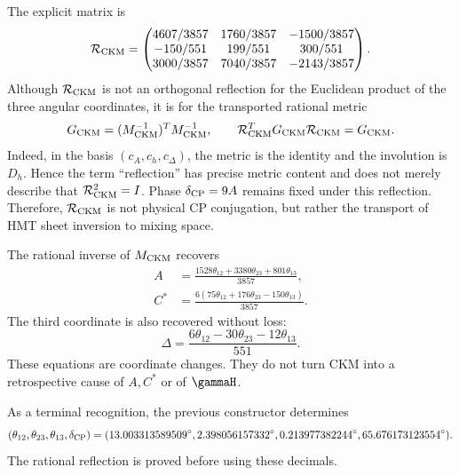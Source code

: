 The explicit matrix is
\begin{equation}
\label{rm:eq:modular-Rckm-matrix}
\mathcal R_{\rm CKM}=
\begin{pmatrix}
4607/3857&1760/3857&-1500/3857\\
-150/551&199/551&300/551\\
3000/3857&7040/3857&-2143/3857
\end{pmatrix}.
\end{equation}
Although \(\mathcal R_{\rm CKM}\) is not an orthogonal reflection for the
Euclidean product of the three angular coordinates, it is for the
transported rational metric
\begin{equation}
\label{rm:eq:modular-ckm-metric}
G_{\rm CKM}=(M_{\rm CKM}^{-1})^TM_{\rm CKM}^{-1},
\qquad
\mathcal R_{\rm CKM}^TG_{\rm CKM}\mathcal R_{\rm CKM}=G_{\rm CKM}.
\end{equation}
Indeed, in the basis \((c_A,c_h,c_\Delta)\), the metric is the identity
and the involution is \(D_h\). Hence the term ``reflection'' has
precise metric content and does not merely describe that
\(\mathcal R_{\rm CKM}^2=I\).
Phase \(\delta_{\rm CP}=9A\) remains fixed under this reflection. Therefore,
\(\mathcal R_{\rm CKM}\) is not physical CP conjugation, but rather the
transport of HMT sheet inversion to mixing space.

The rational inverse of \(M_{\rm CKM}\) recovers
\begin{align}
A&=\frac{1528\theta_{12}+3380\theta_{23}+801\theta_{13}}{3857},
\label{rm:eq:modular-A-from-ckm}\\
C^*&=\frac{6(75\theta_{12}+176\theta_{23}-150\theta_{13})}{3857}.
\label{rm:eq:modular-C-from-ckm}
\end{align}
The third coordinate is also recovered without loss:
\begin{equation}
\label{rm:eq:modular-Delta-from-ckm}
\Delta
=\frac{6\theta_{12}-30\theta_{23}-12\theta_{13}}{551}.
\end{equation}
These equations are coordinate changes. They do not turn CKM into a
retrospective cause of \(A,C^*\) or of \(\gammaH\).

As a terminal recognition, the previous constructor determines
\begin{equation}
\label{rm:eq:modular-ckm-values}
(\theta_{12},\theta_{23},\theta_{13},\delta_{\rm CP})
=(13.003313589509^\circ,
2.398056157332^\circ,
0.213977382244^\circ,
65.676173123554^\circ).
\end{equation}
The rational reflection is proved before using these decimals.

